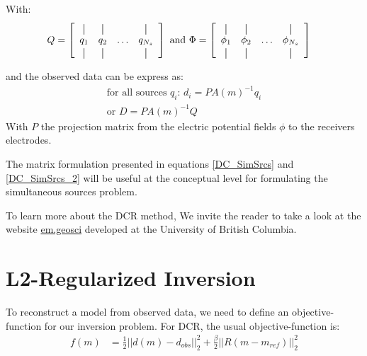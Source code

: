 \documentclass[twoside]{article}
\begin{document}
With:
\begin{align}
Q = 
\left[
  \begin{array}{cccc}
    \vertbar & \vertbar &        & \vertbar \\
    q_{1}    & q_{2}    & \ldots & q_{N_s}    \\
    \vertbar & \vertbar &        & \vertbar 
  \end{array}
\right]
\text{ and }&
\Phi = 
\left[
  \begin{array}{cccc}
    \vertbar & \vertbar &        & \vertbar \\
    \phi_{1}    & \phi_{2}    & \ldots & \phi_{N_s}    \\
    \vertbar & \vertbar &        & \vertbar 
  \end{array}
\right]
\end{align}

and the observed data can be express as: 
\begin{align}
\text{for all sources $q_i$: } d_i = PA(m)^{-1}q_i \label{data} \\
\text{or }D = PA(m)^{-1}Q \label{DC_SimSrcs_2}
\end{align}
With $P$ the projection matrix from the electric potential fields $\phi$ to the receivers electrodes.

The matrix formulation presented in equations \ref{DC_SimSrcs} and \ref{DC_SimSrcs_2} will be useful at the conceptual level for formulating the simultaneous sources problem.

To learn more about the DCR method, We invite the reader to take a look at the website \href{http://em.geosci.xyz/content/geophysical_surveys/dcr/index.html}{em.geosci} developed at the University of British Columbia.

\section{L2-Regularized Inversion}

To reconstruct a model from observed data, we need to define an objective-function for our inversion problem. For DCR, the usual objective-function is:
\begin{align}
f(m) &= \frac{1}{2} ||d(m)-d_{obs}||_2^2 + \frac{\beta }{2} ||R(m-m_{ref})||_2^2 \label{objectiveFunction}
\end{align}
\end{document}
